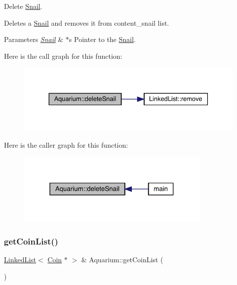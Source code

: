 Delete \mbox{\hyperlink{class_snail}{Snail}}. 

Deletes a \mbox{\hyperlink{class_snail}{Snail}} and removes it from content\+\_\+snail list. 
\begin{DoxyParams}{Parameters}
{\em \mbox{\hyperlink{class_snail}{Snail}}} & $\ast$s Pointer to the \mbox{\hyperlink{class_snail}{Snail}}. \\
\hline
\end{DoxyParams}
Here is the call graph for this function\+:\nopagebreak
\begin{figure}[H]
\begin{center}
\leavevmode
\includegraphics[width=330pt]{class_aquarium_a08048866266aabb12b8cc82bac042c18_cgraph}
\end{center}
\end{figure}
Here is the caller graph for this function\+:\nopagebreak
\begin{figure}[H]
\begin{center}
\leavevmode
\includegraphics[width=268pt]{class_aquarium_a08048866266aabb12b8cc82bac042c18_icgraph}
\end{center}
\end{figure}
\mbox{\label{class_aquarium_a3b3592004ace881a5e11d19a8dc127e4}} 
\subsubsection{\texorpdfstring{get\+Coin\+List()}{getCoinList()}}
{\footnotesize\ttfamily \mbox{\hyperlink{class_linked_list}{Linked\+List}}$<$ \mbox{\hyperlink{class_coin}{Coin}} $\ast$ $>$ \& Aquarium\+::get\+Coin\+List (\begin{DoxyParamCaption}{ }\end{DoxyParamCaption})}



